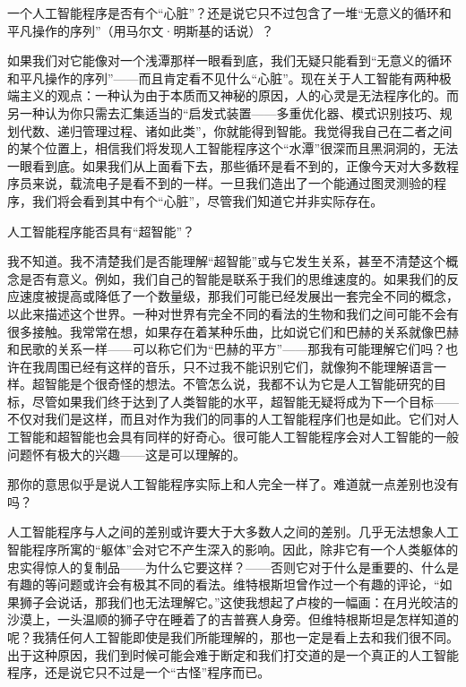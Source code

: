 \begin{description}[speculation]
\item[问题]一个人工智能程序是否有个“心脏”？还是说它只不过包含了一堆“无意义的循环和平凡操作的序列”（用马尔文·明斯基的话说）？
\item[推测]如果我们对它能像对一个浅潭那样一眼看到底，我们无疑只能看到“无意义的循环和平凡操作的序列”——而且肯定看不见什么“心脏”。现在关于人工智能有两种极端主义的观点：一种认为由于本质而又神秘的原因，人的心灵是无法程序化的。而另一种认为你只需去汇集适当的“启发式装置——多重优化器、模式识别技巧、规划代数、递归管理过程、诸如此类”，你就能得到智能。我觉得我自己在二者之间的某个位置上，相信我们将发现人工智能程序这个“水潭”很深而且黑洞洞的，无法一眼看到底。如果我们从上面看下去，那些循环是看不到的，正像今天对大多数程序员来说，载流电子是看不到的一样。一旦我们造出了一个能通过图灵测验的程序，我们将会看到其中有个“心脏”，尽管我们知道它并非实际存在。

\item[问题]人工智能程序能否具有“超智能”？
\item[推测]我不知道。我不清楚我们是否能理解“超智能”或与它发生关系，甚至不清楚这个概念是否有意义。例如，我们自己的智能是联系于我们的思维速度的。如果我们的反应速度被提高或降低了一个数量级，那我们可能已经发展出一套完全不同的概念，以此来描述这个世界。一种对世界有完全不同的看法的生物和我们之间可能不会有很多接触。我常常在想，如果存在着某种乐曲，比如说它们和巴赫的关系就像巴赫和民歌的关系一样——可以称它们为“巴赫的平方”——那我有可能理解它们吗？也许在我周围已经有这样的音乐，只不过我不能识别它们，就像狗不能理解语言一样。超智能是个很奇怪的想法。不管怎么说，我都不认为它是人工智能研究的目标，尽管如果我们终于达到了人类智能的水平，超智能无疑将成为下一个目标——不仅对我们是这样，而且对作为我们的同事的人工智能程序们也是如此。它们对人工智能和超智能也会具有同样的好奇心。很可能人工智能程序会对人工智能的一般问题怀有极大的兴趣——这是可以理解的。

\item[问题]那你的意思似乎是说人工智能程序实际上和人完全一样了。难道就一点差别也没有吗？
\item[推测]人工智能程序与人之间的差别或许要大于大多数人之间的差别。几乎无法想象人工智能程序所寓的“躯体”会对它不产生深入的影响。因此，除非它有一个人类躯体的忠实得惊人的复制品——为什么它要这样？——否则它对于什么是重要的、什么是有趣的等问题或许会有极其不同的看法。维特根斯坦曾作过一个有趣的评论，“如果狮子会说话，那我们也无法理解它。”这使我想起了卢梭的一幅画：在月光皎洁的沙漠上，一头温顺的狮子守在睡着了的吉普赛人身旁。但维特根斯坦是怎样知道的呢？我猜任何人工智能即使是我们所能理解的，那也一定是看上去和我们很不同。出于这种原因，我们到时候可能会难于断定和我们打交道的是一个真正的人工智能程序，还是说它只不过是一个“古怪”程序而已。


\end{description}
